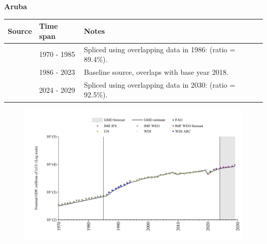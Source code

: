 \documentclass[12pt,a4paper,landscape]{article}
\begin{document}
\begin{adjustbox}{max totalsize={\paperwidth}{\paperheight},center}
\begin{minipage}[t][\textheight][t]{\textwidth}
\vspace*{0.5cm}
{}
\begin{center}
{\Large\bfseries Aruba}
\end{center}
\vspace{0.5cm}
\begin{table}[H]
\centering
\small
\begin{tabular}{|l|l|l|}
\hline
\textbf{Source} & \textbf{Time span} & \textbf{Notes} \\
\hline
\rowcolor{white}\cite{UN}& 1970 - 1985 &Spliced using overlapping data in 1986: (ratio = 89.4\%).\\
\rowcolor{lightgray}\cite{WDI}& 1986 - 2023 &Baseline source, overlaps with base year 2018.\\
\rowcolor{white}\cite{IMF_WEO_forecast}& 2024 - 2029 &Spliced using overlapping data in 2030: (ratio = 92.5\%).\\
\hline
\end{tabular}
\end{table}
\begin{figure}[H]
\centering
\includegraphics[width=\textwidth,height=0.6\textheight,keepaspectratio]{graphs/ABW_nGDP.pdf}
\end{figure}
\end{minipage}
\end{adjustbox}
\end{document}
